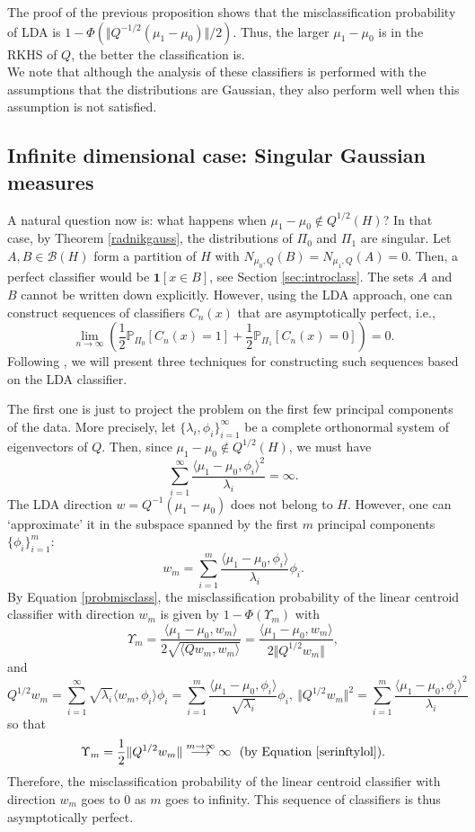 \documentclass[10pt, a4paper]{report}
\newcommand{\Pp}[0]{\mathbb{P}}
\theoremstyle{definition}
\theoremstyle{remark}
\begin{document}
The proof of the previous proposition shows that the misclassification probability of LDA is $1-\Phi\left(\Vert Q^{-1/2}(\mu_1-\mu_0)\Vert/2\right)$. Thus, the larger $\mu_1-\mu_0$ is in the RKHS of $Q$, the better the classification is.\\
We note that although the analysis of these classifiers is performed with the assumptions that the distributions are Gaussian, they also perform well when this assumption is not satisfied. 
\subsection{Infinite dimensional case: Singular Gaussian measures}
A natural question now is: what happens when $\mu_1-\mu_0 \notin Q^{1/2}(H)$? In that case, by Theorem \ref{radnikgauss}, the distributions of $\Pi_0$ and $\Pi_1$ are singular. Let $A,B\in \mathcal{B}(H)$ form a partition of $H$ with $N_{\mu_0,Q}(B)=N_{\mu_1,Q}(A)=0$. Then, a perfect classifier would be $\mathbf{1}[x\in B]$, see Section \ref{sec:introclass}. The sets $A$ and $B$ cannot be written down explicitly. However, using the LDA approach, one can construct sequences of classifiers $C_n(x)$ that are asymptotically perfect, i.e.,
$$\lim_{n\to \infty} \left(\frac{1}{2}\Pp_{\Pi_0}[C_n(x)=1] + \frac{1}{2}\Pp_{\Pi_1}[C_n(x)=0]\right)=0.$$
Following \cite{Kraus2}, we will present three techniques for constructing such sequences based on the LDA classifier.

The first one is just to project the problem on the first few principal components of the data. More precisely, let $\{\lambda_i,\phi_i\}_{i=1}^\infty$ be a complete orthonormal system of eigenvectors of $Q$. Then, since $\mu_1-\mu_0 \notin Q^{1/2}(H)$, we must have 
\begin{equation}\label{serinftylol}
	\sum_{i=1}^{\infty} \frac{\langle \mu_1 -\mu_0, \phi_i\rangle^2 }{\lambda_i} = \infty.
\end{equation}
The LDA direction $w = Q^{-1}(\mu_1-\mu_0)$ does not belong to $H$. However, one can `approximate' it in the subspace spanned by the first $m$ principal components $\{\phi_i\}_{i=1}^m$:
$$w_m = \sum_{i=1}^{m} \frac{\langle \mu_1 -\mu_0, \phi_i\rangle }{\lambda_i}\phi_i.$$
By Equation \ref{probmisclass}, the misclassification probability of the linear centroid classifier with direction $w_m$ is given by $1-\Phi(\Upsilon_m)$ with 
\begin{equation*}
	\Upsilon_m =  \frac{\langle \mu_1 - \mu_0, w_m\rangle }{2\sqrt{\langle Qw_m,w_m\rangle}} = \frac{\langle \mu_1-\mu_0, w_m\rangle}{2\Vert Q^{1/2}w_m \Vert},
\end{equation*}
and 
$$ Q^{1/2}w_m = \sum_{i=1}^\infty \sqrt{\lambda_i} \langle w_m,\phi_i\rangle \phi_i = \sum_{i=1}^{m} \frac{\langle \mu_1 -\mu_0, \phi_i\rangle }{\sqrt{\lambda_i}}\phi_i, \ \Vert Q^{1/2}w_m \Vert^2 = \sum_{i=1}^{m} \frac{\langle \mu_1 -\mu_0, \phi_i\rangle^2 }{\lambda_i} $$
so that 
$$\Upsilon_m = \frac{1}{2} \Vert Q^{1/2}w_m\Vert \stackrel{m \to \infty}{\longrightarrow} \infty \ \text{ (by Equation \ref{serinftylol}).}  $$ 
Therefore, the misclassification probability of the linear centroid classifier with direction $w_m$  goes to 0 as $m$ goes to infinity. This sequence of classifiers is thus asymptotically perfect.
\end{document}
